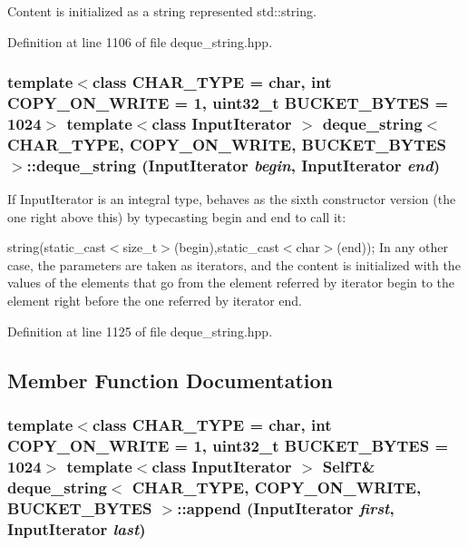Content is initialized as a string represented std::string. 

Definition at line 1106 of file deque\_\-string.hpp.\hypertarget{classdeque__string_b76b1f9d84f09742d21593ae38d7e3c2}{
\subsubsection[{deque\_\-string}]{\setlength{\rightskip}{0pt plus 5cm}template$<$class CHAR\_\-TYPE  = char, int COPY\_\-ON\_\-WRITE = 1, uint32\_\-t BUCKET\_\-BYTES = 1024$>$ template$<$class InputIterator $>$ {\bf deque\_\-string}$<$ CHAR\_\-TYPE, COPY\_\-ON\_\-WRITE, BUCKET\_\-BYTES $>$::{\bf deque\_\-string} (InputIterator {\em begin}, \/  InputIterator {\em end})}}
\label{classdeque__string_b76b1f9d84f09742d21593ae38d7e3c2}


If InputIterator is an integral type, behaves as the sixth constructor version (the one right above this) by typecasting begin and end to call it:

string(static\_\-cast$<$size\_\-t$>$(begin),static\_\-cast$<$char$>$(end)); In any other case, the parameters are taken as iterators, and the content is initialized with the values of the elements that go from the element referred by iterator begin to the element right before the one referred by iterator end. 

Definition at line 1125 of file deque\_\-string.hpp.

\subsection{Member Function Documentation}
\hypertarget{classdeque__string_315b9c547074d7ce32814aa011e26b39}{
\subsubsection[{append}]{\setlength{\rightskip}{0pt plus 5cm}template$<$class CHAR\_\-TYPE  = char, int COPY\_\-ON\_\-WRITE = 1, uint32\_\-t BUCKET\_\-BYTES = 1024$>$ template$<$class InputIterator $>$ {\bf SelfT}\& {\bf deque\_\-string}$<$ CHAR\_\-TYPE, COPY\_\-ON\_\-WRITE, BUCKET\_\-BYTES $>$::append (InputIterator {\em first}, \/  InputIterator {\em last})}}
\label{classdeque__string_315b9c547074d7ce32814aa011e26b39}


